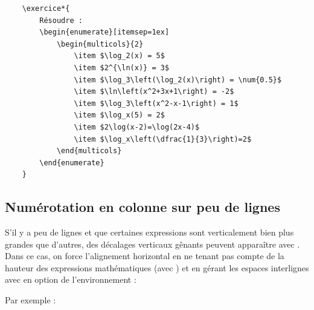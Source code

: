 \begin{verbatim}
	\exercice*{
		Résoudre :
		\begin{enumerate}[itemsep=1ex]
			\begin{multicols}{2}
				\item $\log_2(x) = 5$ 
				\item $2^{\ln(x)} = 3$ 
				\item $\log_3\left(\log_2(x)\right) = \num{0.5}$
				\item $\ln\left(x^2+3x+1\right) = -2$		
				\item $\log_3\left(x^2-x-1\right) = 1$
				\item $\log_x(5) = 2$
				\item $2\log(x-2)=\log(2x-4)$
				\item $\log_x\left(\dfrac{1}{3}\right)=2$
			\end{multicols}
		\end{enumerate}
	}
\end{verbatim}




\subsection{Numérotation en colonne sur peu de lignes}

S'il y a peu de lignes et que certaines expressions sont verticalement bien plus grandes que d'autres, des décalages verticaux gênants peuvent apparaître avec . Dans ce cas, on force l'alignement horizontal en ne tenant pas compte de la hauteur des expressions mathématiques (avec \inlatex{\smash}) et en gérant les espaces interlignes avec  en option de l'environnement  :

Par exemple :


